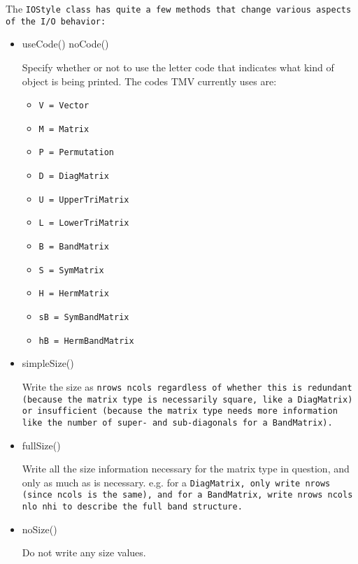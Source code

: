 The \tt{IOStyle} class has quite a few methods that change various aspects of the I/O behavior:

\begin{itemize}
\item
\begin{tmvcode}
useCode()
noCode()
\end{tmvcode}
Specify whether or not to use the letter code that indicates what kind of object is being printed.  The codes TMV currently uses are:
\begin{itemize} \itemsep -2pt
\item \tt{V = Vector}
\item \tt{M = Matrix}
\item \tt{P = Permutation}
\item \tt{D = DiagMatrix}
\item \tt{U = UpperTriMatrix}
\item \tt{L = LowerTriMatrix}
\item \tt{B = BandMatrix}
\item \tt{S = SymMatrix}
\item \tt{H = HermMatrix}
\item \tt{sB = SymBandMatrix}
\item \tt{hB = HermBandMatrix}
\end{itemize}

\item
\begin{tmvcode}
simpleSize()
\end{tmvcode}
Write the size as \tt{nrows ncols} regardless of whether this is redundant (because the matrix type is necessarily square, like a \tt{DiagMatrix}) or insufficient (because the matrix type needs more information like the number of super- and sub-diagonals for a \tt{BandMatrix}).

\item
\begin{tmvcode}
fullSize()
\end{tmvcode}
Write all the size information necessary for the matrix type in question, and only as much as is necessary.  e.g. for a \tt{DiagMatrix}, only write \tt{nrows} (since \tt{ncols} is the same), and for a \tt{BandMatrix}, write \tt{nrows ncols nlo nhi} to describe the full band structure.

\item
\begin{tmvcode}
noSize()
\end{tmvcode}
Do not write any size values.


\end{itemize}
